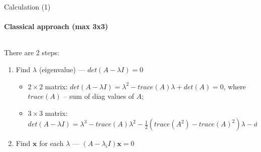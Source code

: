 \documentclass[aspectratio=169]{beamer}
\begin{document}
\begin{frame}[t]{Calculation (1)}
    \framesubtitle{Classical approach (max 3x3)}
    \vspace{-0.3cm}
    \begin{columns}[T,onlytextwidth]
        \begin{column}{0.49\textwidth}
            There are 2 steps:
            \begin{enumerate}
                \item Find $\lambda$ (eigenvalue) --- $det(A-\lambda I)=0$
                \begin{itemize}
                    \item $2\times2$ matrix: $det(A-\lambda I) = \lambda^2 - trace(A)\lambda + det(A) = 0$, where $trace(A)$ -- sum of diag values of $A$;
                    \item $3\times3$ matrix: $det(A-\lambda I) = \lambda^3 - trace(A)\lambda^2 - \frac{1}{2}(trace(A^2)-trace(A)^2)\lambda - det(A) = 0$ 
                \end{itemize}
                \item Find $\mathbf{x}$ for each $\lambda$ --- $(A-\lambda_i I)\mathbf{x} = 0 $
            \end{enumerate}


\end{column}
\end{columns}
\end{frame}
\end{document}
